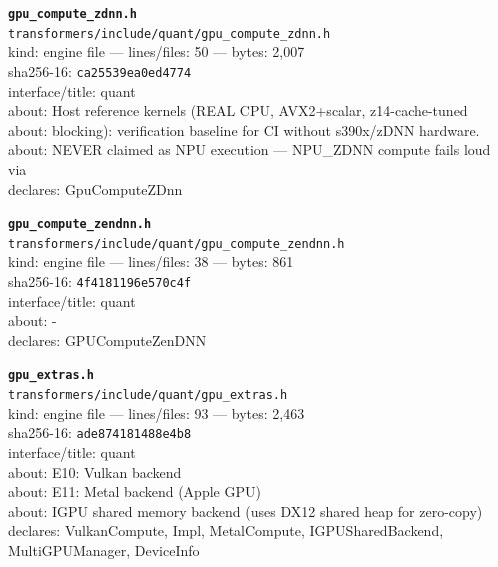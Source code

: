 \noindent\textbf{\texttt{gpu\_compute\_zdnn.h}}\\
\texttt{transformers/include/quant/gpu\_compute\_zdnn.h}\\
kind: engine file --- lines/files: 50 --- bytes: 2,007\\
sha256-16: \texttt{ca25539ea0ed4774}\\
interface/title: quant\\
about: Host reference kernels (REAL CPU, AVX2+scalar, z14-cache-tuned\\
about: blocking): verification baseline for CI without s390x/zDNN hardware.\\
about: NEVER claimed as NPU execution — NPU\_ZDNN compute fails loud via\\
declares: GpuComputeZDnn\\
\vspace*{6.0pt}

\noindent\textbf{\texttt{gpu\_compute\_zendnn.h}}\\
\texttt{transformers/include/quant/gpu\_compute\_zendnn.h}\\
kind: engine file --- lines/files: 38 --- bytes: 861\\
sha256-16: \texttt{4f4181196e570c4f}\\
interface/title: quant\\
about: -\\
declares: GPUComputeZenDNN\\
\vspace*{6.0pt}

\noindent\textbf{\texttt{gpu\_extras.h}}\\
\texttt{transformers/include/quant/gpu\_extras.h}\\
kind: engine file --- lines/files: 93 --- bytes: 2,463\\
sha256-16: \texttt{ade874181488e4b8}\\
interface/title: quant\\
about: E10: Vulkan backend\\
about: E11: Metal backend (Apple GPU)\\
about: IGPU shared memory backend (uses DX12 shared heap for zero-copy)\\
declares: VulkanCompute, Impl, MetalCompute, IGPUSharedBackend, MultiGPUManager, DeviceInfo\\
\vspace*{6.0pt}

